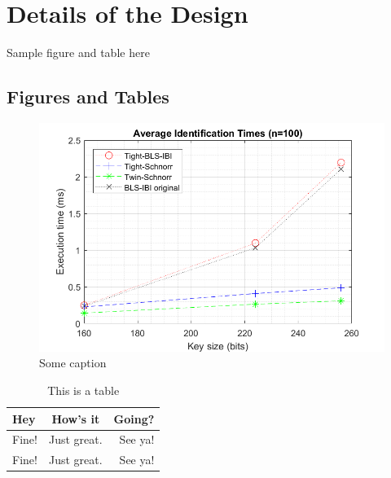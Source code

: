 \chapter{Details of the Design}
Sample figure and table here

\section{Figures and Tables}
\lipsum[1]

\begin{figure}[hbt!]\centering
\includegraphics[width=\textwidth]{figures/nid2.png}
\caption{Some caption}
\end{figure}

\lipsum[5]

\begin{table}[hbt!]
\caption{This is a table}
\centering
\begin{tabular}{ l c r }
\hline
Hey & How's it & Going?\\ \hline
Fine! & Just great. & See ya!\\
Fine! & Just great. & See ya!\\
\hline
\end{tabular}
\end{table}


